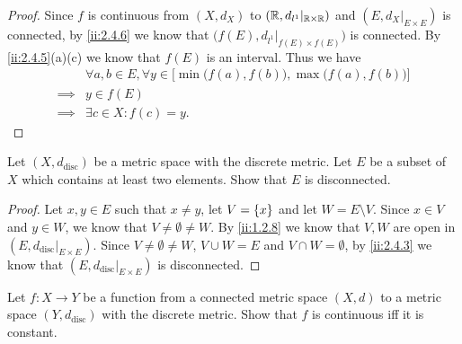 \begin{proof}
  Since \(f\) is continuous from \((X, d_X)\) to \((\mathbb{R}, d_{l^1}|_{\mathbb{R} \times \mathbb{R}})\) and \((E, d_X|_{E \times E})\) is connected, by \cref{ii:2.4.6} we know that \(\big(f(E), d_{l^1}|_{f(E) \times f(E)}\big)\) is connected.
  By \cref{ii:2.4.5}(a)(c) we know that \(f(E)\) is an interval.
  Thus we have
  \begin{align*}
             & \forall a, b \in E, \forall y \in \Big[\min\big(f(a), f(b)\big), \max\big(f(a), f(b)\big)\Big] \\
    \implies & y \in f(E)                                                                                     \\
    \implies & \exists c \in X : f(c) = y.
  \end{align*}
\end{proof}

\exercisesection

\begin{ex}\label{ii:ex:2.4.1}
  Let \((X, d_{\text{disc}})\) be a metric space with the discrete metric.
  Let \(E\) be a subset of \(X\) which contains at least two elements.
  Show that \(E\) is disconnected.
\end{ex}

\begin{proof}
  Let \(x, y \in E\) such that \(x \neq y\), let \(V = \left\lbrace x\right\rbrace\) and let \(W = E \setminus V\).
  Since \(x \in V\) and \(y \in W\), we know that \(V \neq \emptyset \neq W\).
  By \cref{ii:1.2.8} we know that \(V, W\) are open in \((E, d_{\text{disc}}|_{E \times E})\).
  Since \(V \neq \emptyset \neq W\), \(V \cup W = E\) and \(V \cap W = \emptyset\), by \cref{ii:2.4.3} we know that \((E, d_{\text{disc}}|_{E \times E})\) is disconnected.
\end{proof}

\begin{ex}\label{ii:ex:2.4.2}
  Let \(f : X \to Y\) be a function from a connected metric space \((X, d)\) to a metric space \((Y, d_{\text{disc}})\) with the discrete metric.
  Show that \(f\) is continuous iff it is constant.
\end{ex}

